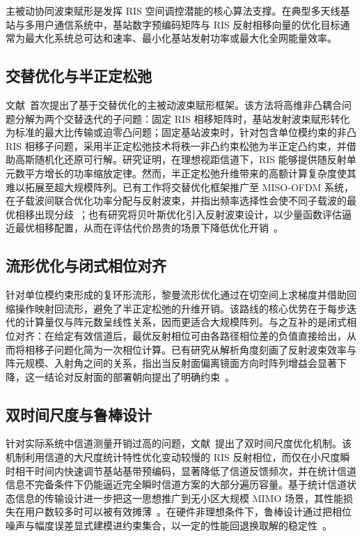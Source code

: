 主被动协同波束赋形是发挥 RIS 空间调控潜能的核心算法支撑。在典型多天线基站与多用户通信系统中，基站数字预编码矩阵与 RIS 反射相移向量的优化目标通常为最大化系统总可达和速率、最小化基站发射功率或最大化全网能量效率。

\subsection{交替优化与半正定松弛}
文献~\cite{wu2019intelligent}首次提出了基于交替优化的主被动波束赋形框架。该方法将高维非凸耦合问题分解为两个交替迭代的子问题：固定 RIS 相移矩阵时，基站发射波束赋形转化为标准的最大比传输或迫零凸问题；固定基站波束时，针对包含单位模约束的非凸 RIS 相移子问题，采用半正定松弛技术将秩一非凸约束松弛为半正定凸约束，并借助高斯随机化还原可行解。研究证明，在理想视距信道下，RIS 能够提供随反射单元数平方增长的功率缩放定律。然而，半正定松弛升维带来的高额计算复杂度使其难以拓展至超大规模阵列。已有工作将交替优化框架推广至 MISO-OFDM 系统，在子载波间联合优化功率分配与反射波束，并指出频率选择性会使不同子载波的最优相移出现分歧~\cite{feng2021ris}；也有研究将贝叶斯优化引入反射波束设计，以少量函数评估逼近最优相移配置，从而在评估代价昂贵的场景下降低优化开销~\cite{wang2022ris}。

\subsection{流形优化与闭式相位对齐}
针对单位模约束形成的复环形流形，黎曼流形优化通过在切空间上求梯度并借助回缩操作映射回流形，避免了半正定松弛的升维开销。该路线的核心优势在于每步迭代的计算量仅与阵元数呈线性关系，因而更适合大规模阵列。与之互补的是闭式相位对齐：在给定有效信道后，最优反射相位可由各路径相位差的负值直接给出，从而将相移子问题化简为一次相位计算。已有研究从解析角度刻画了反射波束效率与阵元规模、入射角之间的关系，指出当反射面偏离镜面方向时阵列增益会显著下降，这一结论对反射面的部署朝向提出了明确约束~\cite{stratidakis2021ris}。

\subsection{双时间尺度与鲁棒设计}
针对实际系统中信道测量开销过高的问题，文献~\cite{zhi2023timescale}提出了双时间尺度优化机制。该机制利用信道的大尺度统计特性优化变动较慢的 RIS 反射相位，而仅在小尺度瞬时相干时间内快速调节基站基带预编码，显著降低了信道反馈频次，并在统计信道信息不完备条件下仍能逼近完全瞬时信道方案的大部分遍历容量。基于统计信道状态信息的传输设计进一步把这一思想推广到无小区大规模 MIMO 场景，其性能损失在用户数较多时可以被有效摊薄~\cite{dai2022ris}。在硬件非理想条件下，鲁棒设计通过把相位噪声与幅度误差显式建模进约束集合，以一定的性能回退换取解的稳定性~\cite{chen2025ris,zhang2023ris}。

